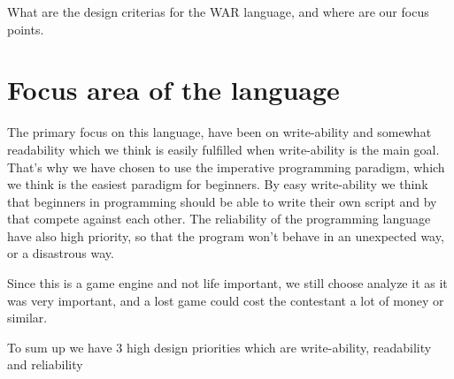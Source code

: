 What are the design criterias for the WAR language, and where are our focus points.

\section{Focus area of the language}

The primary focus on this language, have been on write-ability and somewhat readability which we think is easily fulfilled when write-ability is the main goal. That's why we have chosen to use the imperative programming paradigm, which we think is the easiest paradigm for beginners. By easy write-ability we think that beginners in programming should be able to write their own script and by that compete against each other. The reliability of the programming language have also high priority, so that the program won't behave in an unexpected way, or a disastrous way.

 
Since this is a game engine and not life important, we still choose analyze it as it was very important, and a lost game could cost the contestant a lot of money or similar.

To sum up we have 3 high design priorities which are write-ability, readability and reliability